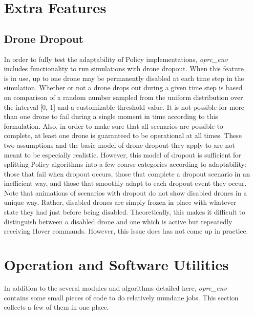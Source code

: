 \section{Extra Features}

\subsection{Drone Dropout}

In order to fully test the adaptability of Policy implementations, \textit{oprc\_env} includes functionality to run simulations with drone dropout. When this feature is in use, up to one drone may be permanently disabled at each time step in the simulation. Whether or not a drone drops out during a given time step is based on comparison of a random number sampled from the uniform distribution over the interval [0, 1] and a customizable threshold value. It is not possible for more than one drone to fail during a single moment in time according to this formulation. Also, in order to make sure that all scenarios are possible to complete, at least one drone is guaranteed to be operational at all times. These two assumptions and the basic model of drone dropout they apply to are not meant to be especially realistic. However, this model of dropout is sufficient for splitting Policy algorithms into a few coarse categories according to adaptability: those that fail when dropout occurs, those that complete a dropout scenario in an inefficient way, and those that smoothly adapt to each dropout event they occur. Note that animations of scenarios with dropout do not show disabled drones in a unique way. Rather, disabled drones are simply frozen in place with whatever state they had just before being disabled. Theoretically, this makes it difficult to distinguish between a disabled drone and one which is active but repeatedly receiving Hover commands. However, this issue does has not come up in practice.


\section{Operation and Software Utilities}

In addition to the several modules and algorithms detailed here, \textit{oprc\_env} contains some small pieces of code to do relatively mundane jobs. This section collects a few of them in one place.

